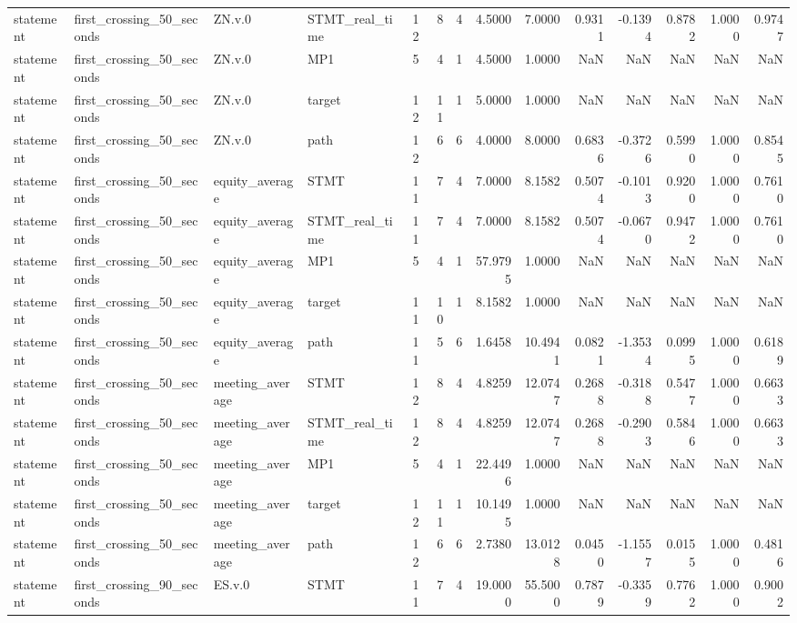 \begin{tabular}{llllrrrrrrrrrr}
statement & first_crossing_50_seconds & ZN.v.0 & STMT_real_time & 12 & 8 & 4 & 4.5000 & 7.0000 & 0.9311 & -0.1394 & 0.8782 & 1.0000 & 0.9747 \\
statement & first_crossing_50_seconds & ZN.v.0 & MP1 & 5 & 4 & 1 & 4.5000 & 1.0000 & NaN & NaN & NaN & NaN & NaN \\
statement & first_crossing_50_seconds & ZN.v.0 & target & 12 & 11 & 1 & 5.0000 & 1.0000 & NaN & NaN & NaN & NaN & NaN \\
statement & first_crossing_50_seconds & ZN.v.0 & path & 12 & 6 & 6 & 4.0000 & 8.0000 & 0.6836 & -0.3726 & 0.5990 & 1.0000 & 0.8545 \\
statement & first_crossing_50_seconds & equity_average & STMT & 11 & 7 & 4 & 7.0000 & 8.1582 & 0.5074 & -0.1013 & 0.9200 & 1.0000 & 0.7610 \\
statement & first_crossing_50_seconds & equity_average & STMT_real_time & 11 & 7 & 4 & 7.0000 & 8.1582 & 0.5074 & -0.0670 & 0.9472 & 1.0000 & 0.7610 \\
statement & first_crossing_50_seconds & equity_average & MP1 & 5 & 4 & 1 & 57.9795 & 1.0000 & NaN & NaN & NaN & NaN & NaN \\
statement & first_crossing_50_seconds & equity_average & target & 11 & 10 & 1 & 8.1582 & 1.0000 & NaN & NaN & NaN & NaN & NaN \\
statement & first_crossing_50_seconds & equity_average & path & 11 & 5 & 6 & 1.6458 & 10.4941 & 0.0821 & -1.3534 & 0.0995 & 1.0000 & 0.6189 \\
statement & first_crossing_50_seconds & meeting_average & STMT & 12 & 8 & 4 & 4.8259 & 12.0747 & 0.2688 & -0.3188 & 0.5477 & 1.0000 & 0.6633 \\
statement & first_crossing_50_seconds & meeting_average & STMT_real_time & 12 & 8 & 4 & 4.8259 & 12.0747 & 0.2688 & -0.2903 & 0.5846 & 1.0000 & 0.6633 \\
statement & first_crossing_50_seconds & meeting_average & MP1 & 5 & 4 & 1 & 22.4496 & 1.0000 & NaN & NaN & NaN & NaN & NaN \\
statement & first_crossing_50_seconds & meeting_average & target & 12 & 11 & 1 & 10.1495 & 1.0000 & NaN & NaN & NaN & NaN & NaN \\
statement & first_crossing_50_seconds & meeting_average & path & 12 & 6 & 6 & 2.7380 & 13.0128 & 0.0450 & -1.1557 & 0.0155 & 1.0000 & 0.4816 \\
statement & first_crossing_90_seconds & ES.v.0 & STMT & 11 & 7 & 4 & 19.0000 & 55.5000 & 0.7879 & -0.3359 & 0.7762 & 1.0000 & 0.9002 \\

\end{tabular}
